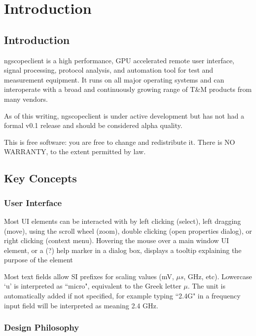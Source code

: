 \chapter{Introduction}

\section{Introduction}

ngscopeclient is a high performance, GPU accelerated remote user interface, signal processing, protocol analysis, and
automation tool for test and measurement equipment. It runs on all major operating systems and can interoperate with a
broad and continuously growing range of T\&M products from many vendors.

As of this writing, ngscopeclient is under active development but has not had a formal v0.1
release and should be considered alpha quality.

This is free software: you are free to change and redistribute it.
There is NO WARRANTY, to the extent permitted by law.

\section{Key Concepts}

\subsection{User Interface}

Most UI elements can be interacted with by left clicking (select), left dragging (move), using the scroll wheel (zoom),
double clicking (open properties dialog), or right clicking (context menu). Hovering the mouse over a main window UI
element, or a (?) help marker in a dialog box, displays a tooltip explaining the purpose of the element


Most text fields allow SI prefixes for scaling values (mV, $\mu s$, GHz, etc). Lowercase `u' is interpreted as
``micro", equivalent to the Greek letter $\mu$. The unit is automatically added if not specified, for example typing
``2.4G" in a frequency input field will be interpreted as meaning 2.4 GHz.

\subsection{Design Philosophy}

